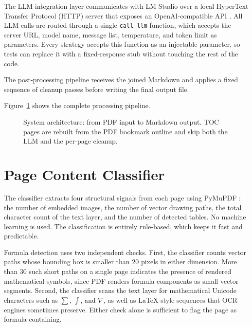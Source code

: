 The LLM integration layer communicates with LM Studio \autocite{lmstudio} over a local HyperText Transfer Protocol (HTTP) server that exposes an OpenAI-compatible API \autocite{khan2024}. All LLM calls are routed through a single \texttt{call\_llm} function, which accepts the server URL, model name, message list, temperature, and token limit as parameters. Every strategy accepts this function as an injectable parameter, so tests can replace it with a fixed-response stub without touching the rest of the code.

The post-processing pipeline receives the joined Markdown and applies a fixed sequence of cleanup passes before writing the final output file.

Figure~\ref{fig:architecture} shows the complete processing pipeline.

\begin{figure}[H]
    \centering
    
    \caption[System architecture: from PDF input to Markdown output]{System architecture: from PDF input to Markdown output. TOC pages are rebuilt from the PDF bookmark outline and skip both the LLM and the per-page cleanup.}
    \label{fig:architecture}
\end{figure}

\section{Page Content Classifier}

The classifier extracts four structural signals from each page using PyMuPDF \autocite{pymupdf}: the number of embedded images, the number of vector drawing paths, the total character count of the text layer, and the number of detected tables.
No machine learning is used. The classification is entirely rule-based, which keeps it fast and predictable.

Formula detection uses two independent checks.
First, the classifier counts vector paths whose bounding box is smaller than 20 pixels in either dimension.
More than 30 such short paths on a single page indicates the presence of rendered mathematical symbols, since PDF renders formula components as small vector segments.
Second, the classifier scans the text layer for mathematical Unicode characters such as $\sum$, $\int$, and $\nabla$, as well as LaTeX-style sequences that OCR engines sometimes preserve.
Either check alone is sufficient to flag the page as formula-containing.

